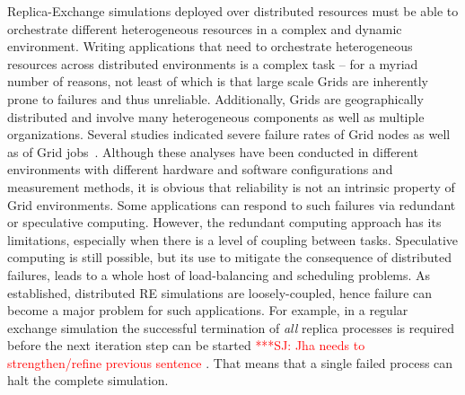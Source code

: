 \documentclass[times, 10pt, twocolumn]{article}
\newcommand{\kimnote}[1]{ {\textcolor{green} { ***JK: #1 }}}
\newcommand{\jhanote}[1]{ {\textcolor{red} { ***SJ: #1 }}}
\newcommand{\kimnote}[1]{}
\newcommand{\jhanote}[1]{}
\begin{document}
  

              

Replica-Exchange simulations deployed over distributed resources must
be able to orchestrate different heterogeneous resources in a complex
and dynamic environment.  Writing applications that need to
orchestrate heterogeneous resources across distributed environments is
a complex task -- for a myriad number of reasons, not least of which
is that large scale Grids are inherently prone to failures and thus
unreliable.  Additionally, Grids are geographically distributed and
involve many heterogeneous components as well as multiple
organizations.  Several studies indicated severe failure rates of Grid
nodes as well as of Grid
jobs~\cite{schroeder,10.1109/E-SCIENCE.2006.93,DBLP:conf/grid/KhaliliHOSC06}.
Although these analyses have been conducted in different environments
with different hardware and software configurations and measurement
methods, it is obvious that reliability is not an intrinsic property
of Grid environments. Some applications can respond to such failures
via redundant or speculative computing.  However, the redundant
computing approach has its limitations, especially when there is a
level of coupling between tasks.  Speculative computing is still
possible, but its use to mitigate the consequence of distributed
failures, leads to a whole host of load-balancing and scheduling
problems.  As established, distributed RE simulations are
loosely-coupled, hence failure can become a major problem for such
applications.  For example, in a regular exchange simulation the
successful termination of \textit{all} replica processes is required before the next
iteration step can be started \jhanote{Jha needs to strengthen/refine
  previous sentence}. That means that a single failed process can halt
the complete simulation.
\end{document}
